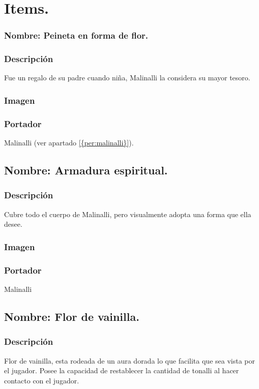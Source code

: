 \chapter{Items.}
	\subsection{Nombre: Peineta en forma de flor.}\label{item:peineta}
	\subsection{Descripción}
	Fue un regalo de su padre cuando niña, Malinalli la considera su mayor tesoro.
	\subsection{Imagen}
	\subsection{Portador}
	Malinalli (ver apartado \ref{{per:malinalli}}).

	\section{Nombre: Armadura espiritual.}\label{item:armadura}
	\subsection{Descripción}
	Cubre todo el cuerpo de Malinalli, pero visualmente adopta una forma que ella desee.
	\subsection{Imagen}
	\subsection{Portador}
	Malinalli 
	
	\section{Nombre: Flor de vainilla.}\label{item:vainilla}
	\subsection{Descripción}
	Flor de vainilla, esta rodeada de un aura dorada lo que facilita que sea vista por el jugador. Posee la capacidad de restablecer la cantidad de tonalli al hacer contacto con el jugador.
